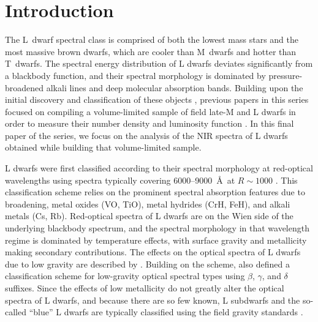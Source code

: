 \documentclass[12pt,preprint]{aastex}
\begin{document}
\section{Introduction}

The L~dwarf spectral class is comprised of both the lowest mass stars and the most massive brown dwarfs, which are cooler than M~dwarfs and hotter than T~dwarfs.
The spectral energy distribution of L dwarfs deviates significantly from a blackbody function, and their spectral morphology is dominated by pressure-broadened alkali lines and deep molecular absorption bands.
Building upon the initial discovery and classification of these objects \citep{K99,Martin99,Kirkpatrick05}, previous papers in this series focused on compiling a volume-limited sample of field late-M and L dwarfs in order to measure their number density and luminosity function \citep[Papers V, IX, and X]{Cruz03,Cruz07,Reid08}.
In this final paper of the series, we focus on the analysis of the NIR spectra of L dwarfs obtained while building that volume-limited sample.

L dwarfs were first classified according to their spectral morphology at red-optical wavelengths using spectra typically covering 6000--9000~\AA~at $R\sim1000$ \citep{Martin99,K99,Kirkpatrick05}.
This classification scheme relies on the prominent spectral absorption features due to  broadening, metal oxides (VO, TiO), metal hydrides (CrH, FeH), and alkali metals (Cs, Rb).
Red-optical spectra of L dwarfs are on the Wien side of the underlying blackbody spectrum, and the spectral morphology in that wavelength regime is dominated by temperature effects, with surface gravity and metallicity making secondary contributions.
The effects on the optical spectra of L dwarfs due to low gravity are described by \citet{Kirkpatrick06,Kirkpatrick08, Cruz09_lowg}.
Building on the \citet{K99} scheme, \citet{Cruz09_lowg} also defined a classification scheme for low-gravity optical spectral types using $\beta$, $\gamma$, and $\delta$ suffixes.
Since the effects of low metallicity do not greatly alter the optical spectra of L dwarfs, and because there are so few known, L subdwarfs and the so-called ``blue'' L dwarfs are typically  classified using the field gravity standards \citep{Burgasser07_subdwarfs, Burgasser08_blue, Kirkpatrick10, Kirkpatrick:2014kv}.
\end{document}
